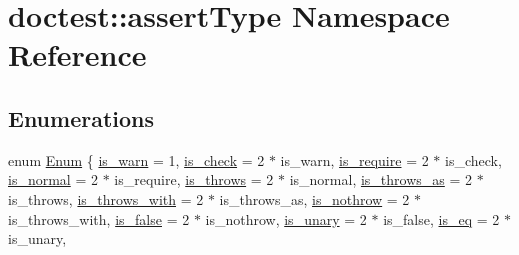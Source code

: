 \hypertarget{namespacedoctest_1_1assert_type}{}\section{doctest\+:\+:assert\+Type Namespace Reference}
\label{namespacedoctest_1_1assert_type}
\subsection*{Enumerations}
\begin{DoxyCompactItemize}
\item 
enum \mbox{\hyperlink{namespacedoctest_1_1assert_type_ae1bb5bed722f34f1c38b83cb19d326d3}{Enum}} \{ \newline
\mbox{\hyperlink{namespacedoctest_1_1assert_type_ae1bb5bed722f34f1c38b83cb19d326d3a2dd798b430ccf956bc48c3b48bb4e570}{is\+\_\+warn}} = 1, 
\mbox{\hyperlink{namespacedoctest_1_1assert_type_ae1bb5bed722f34f1c38b83cb19d326d3a9ca6ff629647f2a90d4c01ce68800590}{is\+\_\+check}} = 2 $\ast$ is\+\_\+warn, 
\mbox{\hyperlink{namespacedoctest_1_1assert_type_ae1bb5bed722f34f1c38b83cb19d326d3aff8fa549e941fb7ca7adcd49d9ffdf6d}{is\+\_\+require}} = 2 $\ast$ is\+\_\+check, 
\mbox{\hyperlink{namespacedoctest_1_1assert_type_ae1bb5bed722f34f1c38b83cb19d326d3a34258afd98e569142dfb5b0a2c468436}{is\+\_\+normal}} = 2 $\ast$ is\+\_\+require, 
\newline
\mbox{\hyperlink{namespacedoctest_1_1assert_type_ae1bb5bed722f34f1c38b83cb19d326d3a922a5fb427724cad963fb3dd789a8114}{is\+\_\+throws}} = 2 $\ast$ is\+\_\+normal, 
\mbox{\hyperlink{namespacedoctest_1_1assert_type_ae1bb5bed722f34f1c38b83cb19d326d3a278ed7bf7e411c11e25ad8a60933ef34}{is\+\_\+throws\+\_\+as}} = 2 $\ast$ is\+\_\+throws, 
\mbox{\hyperlink{namespacedoctest_1_1assert_type_ae1bb5bed722f34f1c38b83cb19d326d3ab79f3f076e62c260e77febd914bb82c3}{is\+\_\+throws\+\_\+with}} = 2 $\ast$ is\+\_\+throws\+\_\+as, 
\mbox{\hyperlink{namespacedoctest_1_1assert_type_ae1bb5bed722f34f1c38b83cb19d326d3a0ad6f07c0273891b1c3f2fd84fe666dc}{is\+\_\+nothrow}} = 2 $\ast$ is\+\_\+throws\+\_\+with, 
\newline
\mbox{\hyperlink{namespacedoctest_1_1assert_type_ae1bb5bed722f34f1c38b83cb19d326d3a6539bad84e35008dc4a4a2c2d0793318}{is\+\_\+false}} = 2 $\ast$ is\+\_\+nothrow, 
\mbox{\hyperlink{namespacedoctest_1_1assert_type_ae1bb5bed722f34f1c38b83cb19d326d3adfaee7d6a907d7681e53e0e91734e058}{is\+\_\+unary}} = 2 $\ast$ is\+\_\+false, 
\mbox{\hyperlink{namespacedoctest_1_1assert_type_ae1bb5bed722f34f1c38b83cb19d326d3a7010ae6142f085a3bfd85caa251c7499}{is\+\_\+eq}} = 2 $\ast$ is\+\_\+unary, 

\end{DoxyCompactItemize}
